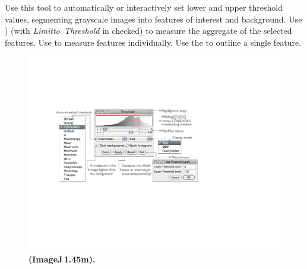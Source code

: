 Use this tool to automatically or interactively set lower and upper
threshold values, segmenting grayscale images into
features of interest and background. Use )
(with \emph{Limitto~Threshold} in 
checked) to measure the aggregate of the selected features. Use 
to measure features individually. Use the 
to outline a single feature.
\begin{figure}
\noindent \includegraphics[width=0.85\columnwidth]{images/Threshold}\caption{\label{Flo:ImageAdjust}\textbf{\protect{}
(ImageJ\,1.45m).}}
\end{figure}
